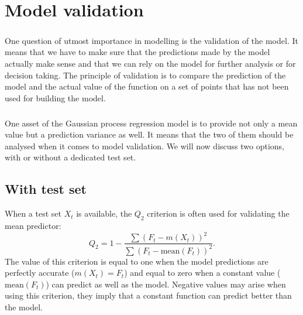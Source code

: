\documentclass[twoside,openright]{report}
\newcommand\todo[1]{\textbf{TODO: #1}}
\begin{document}


\chapter{Model validation}
\paragraph{}
One question of utmost importance in modelling is the validation of the model. It means that we have to make sure that the predictions made by the model actually make sense and that we can rely on the model for further analysis or for decision taking. The principle of validation is to compare the prediction of the model and the actual value of the function on a set of points that has not been used for building the model.  

\paragraph{}
One asset of the Gaussian process regression model is to provide not only a mean value but a prediction variance as well. It means that the two of them should be analysed when it comes to model validation. We will now discuss two options, with or without a dedicated test set. 

\section{With test set}
When a test set $X_t$ is available, the $Q_2$ criterion is often used for validating the mean predictor:
\begin{equation}
Q_2 = 1 - \frac{\sum (F_t - m(X_t))^2}{\sum (F_t - \mathrm{mean}(F_t))^2}.
\end{equation}
The value of this criterion is equal to one when the model predictions are perfectly accurate ($m(X_t) = F_t$) and equal to zero when a constant value ($\mathrm{mean}(F_t)$) can predict as well as the model. Negative values may arise when using this criterion, they imply that a constant function can predict better than the model.
\end{document}
